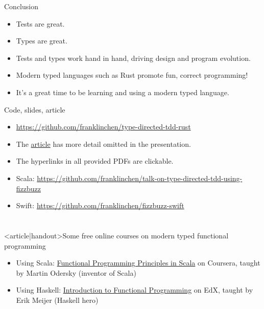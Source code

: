\begin{frame}{Conclusion}
  \begin{itemize}
  \item \alert{Tests} are great.
  \item \alert{Types} are great.
  \item Tests and types work hand in hand, driving design and program evolution.
  \item Modern typed languages such as Rust promote fun, correct programming!
  \item It's a great time to be learning and using a modern typed language.
  \end{itemize}

  \begin{block}{Code, slides, article}
    \begin{itemize}
    \item \url{https://github.com/franklinchen/type-directed-tdd-rust}
    \item The \href{https://github.com/FranklinChen/type-directed-tdd-rust/blob/master/presentation/article.pdf}{article} has more detail omitted in the presentation.
    \item The hyperlinks in all provided PDFs are clickable.
    \item Scala: \url{https://github.com/franklinchen/talk-on-type-directed-tdd-using-fizzbuzz}
    \item Swift: \url{https://github.com/franklinchen/fizzbuzz-swift}
    \end{itemize}
  \end{block}
\end{frame}

\appendix

\section*{\appendixname}

\begin{frame}<article|handout>{Some free online courses on modern typed functional programming}
  \begin{itemize}
  \item Using Scala: \href{http://www.coursera.org/course/progfun}{Functional Programming Principles in Scala} on Coursera, taught by Martin Odersky (inventor of Scala)
  \item Using Haskell: \href{http://www.edx.org/course/delftx/delftx-fp101x-introduction-functional-2126}{Introduction to Functional Programming} on EdX, taught by Erik Meijer (Haskell hero)
  \end{itemize}
\end{frame}




